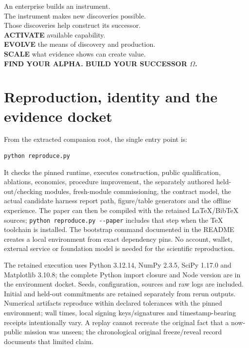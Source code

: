 \documentclass[11pt,letterpaper]{article}
\begin{document}
\begin{claimbox}
\centering\large
An enterprise builds an instrument.\\
The instrument makes new discoveries possible.\\
Those discoveries help construct its successor.\\[9pt]
\normalsize
\textbf{ACTIVATE} available capability.\\
\textbf{EVOLVE} the means of discovery and production.\\
\textbf{SCALE} what evidence shows can create value.\\[9pt]
\textbf{FIND YOUR ALPHA. BUILD YOUR SUCCESSOR $\Omega$.}
\end{claimbox}

\appendix
\section{Reproduction, identity and the evidence docket}
\label{app:reproduce}
From the extracted companion root, the single entry point is:
\begin{lstlisting}
python reproduce.py
\end{lstlisting}
It checks the pinned runtime, executes construction, public qualification, ablations, economics, procedure improvement, the separately authored held-out/checking modules, fresh-module commissioning, the contract model, the actual candidate harness report path, figure/table generators and the offline experience. The paper can then be compiled with the retained LaTeX/BibTeX sources; \texttt{python reproduce.py -{}-paper} includes that step when the TeX toolchain is installed. The bootstrap command documented in the README creates a local environment from exact dependency pins. No account, wallet, external service or foundation model is needed for the scientific reproduction.

The retained execution uses Python 3.12.14, NumPy 2.3.5, SciPy 1.17.0 and Matplotlib 3.10.8; the complete Python import closure and Node version are in the environment docket. Seeds, configuration, sources and raw logs are included. Initial and held-out commitments are retained separately from rerun outputs. Numerical artifacts reproduce within declared tolerances with the pinned environment; wall times, local signing keys/signatures and timestamp-bearing receipts intentionally vary. A replay cannot recreate the original fact that a now-public mission was unseen; the chronological original freeze/reveal record documents that limited claim.
\end{document}
